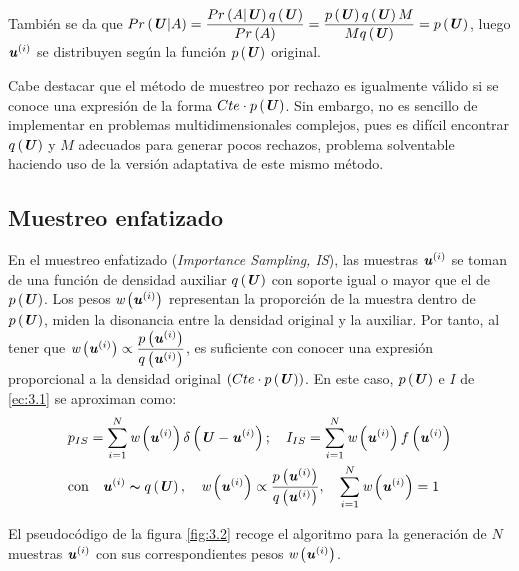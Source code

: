 También se da que $Pr\left(\textbf{\textit{U}}|A\right) = \dfrac{Pr\left(A|\textbf{\textit{U}}\right)q\left(\textbf{\textit{U}}\right)}{Pr\left(A\right)} = \dfrac{p\left(\textbf{\textit{U}}\right)q\left(\textbf{\textit{U}}\right)M}{Mq\left(\textbf{\textit{U}}\right)} = p\left(\textbf{\textit{U}}\right)$, luego $\textbf{\textit{u}}^{(i)}$ se distribuyen según la función $p\left(\textbf{\textit{U}}\right)$ original.

Cabe destacar que el método de muestreo por rechazo es igualmente válido si se conoce una expresión de la forma $Cte\cdot p\left(\textbf{\textit{U}}\right)$. Sin embargo, no es sencillo de implementar en problemas multidimensionales complejos, pues es difícil encontrar $q\left(\textbf{\textit{U}}\right)$ y $M$ adecuados para generar pocos rechazos, problema solventable haciendo uso de la versión adaptativa de este mismo método.

\subsection{Muestreo enfatizado} \label{subsec:IS}
En el muestreo enfatizado (\textit{Importance Sampling, IS}), las muestras $\textbf{\textit{u}}^{(i)}$ se toman de una función de densidad auxiliar  $q\left(\textbf{\textit{U}}\right)$ con soporte igual o mayor que el de $p\left(\textbf{\textit{U}}\right)$. Los pesos $\textit{w}\left(\textbf{\textit{u}}^{(i)}\right)$ representan la proporción de la muestra dentro de $p\left(\textbf{\textit{U}}\right)$, miden la disonancia entre la densidad original y la auxiliar. Por tanto, al tener que $\textit{w}\left(\textbf{\textit{u}}^{(i)}\right) \propto \dfrac{p\left(\textbf{\textit{u}}^{(i)}\right)}{q\left(\textbf{\textit{u}}^{(i)}\right)}$, es suficiente con conocer una expresión proporcional a la densidad original $\left(Cte\cdot p\left(\textbf{\textit{U}}\right)\right)$. En este caso, $p\left(\textbf{\textit{U}}\right)$ e $I$ de  \ref{ec:3.1} se aproximan como:
\begin{equation}
\begin{aligned}
    &p_{IS} = \sum_{i=1}^{N}\textit{w}\left(\textbf{\textit{u}}^{(i)}\right)\delta\left(\textbf{\textit{U}} - \textbf{\textit{u}}^{(i)}\right);
    \quad I_{IS} = \sum_{i=1}^{N}\textit{w}\left(\textbf{\textit{u}}^{(i)}\right) f\left(\textbf{\textit{u}}^{(i)}\right) \\
    &\text{con} \quad \textbf{\textit{u}}^{(i)} \thicksim q\left(\textbf{\textit{U}}\right), \quad \textit{w}\left(\textbf{\textit{u}}^{(i)}\right) \propto \frac{p\left(\textbf{\textit{u}}^{(i)}\right)}{q\left(\textbf{\textit{u}}^{(i)}\right)}, \quad \sum_{i=1}^{N} \textit{w}\left(\textbf{\textit{u}}^{(i)}\right) = 1
\end{aligned}
\label{ec:3.4}
\end{equation}

El pseudocódigo de la figura \ref{fig:3.2} recoge el algoritmo para la generación de $N$ muestras $\textbf{\textit{u}}^{(i)}$ con sus correspondientes pesos $\textit{w}\left(\textbf{\textit{u}}^{(i)}\right)$.

